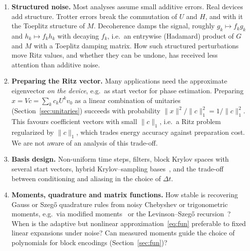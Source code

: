 \documentclass[11pt,a4paper]{article}
\begin{document}
\begin{enumerate}
  vectors $q_k=\pi_k(H)v_0$ can in principle be prepared. One option is to
  apply the Lanczos polynomials through block encodings
  (cf.~\cite{KMM23} and Section~\ref{sec:rr}). Another is an
  operator-level Lanczos recursion, as recently proposed~\cite{OQKD26}.
  Both cost deeper circuits and need recurrence coefficients computed
  from noisy data. This is Lanczos with perturbed coefficients. A theory
  of the resulting loss of orthogonality, in the spirit of Paige's
  analysis of Lanczos in finite precision~\cite{Paige80} with noise
  level $\varepsilon$ in place of $\mathbf u$, would clarify when such schemes beat
  regularized non-orthogonal ones.
\item \textbf{Structured noise.} Most analyses assume small additive
  errors. Real devices add structure. Trotter errors break the
  commutation of $U$ and $H$, and with it the Toeplitz structure of $M$.
  Decoherence damps the signal, roughly $g_k\mapsto f_kg_k$ and
  $h_k\mapsto f_kh_k$ with decaying $f_k$, i.e.\ an entrywise (Hadamard)
  product of $G$ and $M$ with a Toeplitz damping matrix. How such
  structured perturbations move Ritz values, and whether they can be
  undone, has received less attention than additive noise.
\item \textbf{Preparing the Ritz vector.} Many applications need the
  approximate eigenvector \emph{on the device}, e.g.\ as start vector for
  phase estimation. Preparing $x=Vc=\sum_kc_kU^kv_0$ as a linear
  combination of unitaries (Section~\ref{sec:unitaries}) succeeds with
  probability $\|x\|^2/\|c\|_1^2=1/\|c\|_1^2$. This favours coefficient
  vectors with small $\|c\|_1$, i.e.\ a Ritz problem regularized by
  $\|c\|_1$, which trades energy accuracy against preparation cost. We are
  not aware of an analysis of this trade-off.
\item \textbf{Basis design.} Non-uniform time steps, filters, block
  Krylov spaces with several start vectors, hybrid Krylov--sampling
  bases~\cite{SKQD}, and the trade-off between conditioning and aliasing
  in the choice of $\Delta t$.
\item \textbf{Moments, quadrature and matrix functions.} How stable is
  recovering Gauss or Szeg\H{o} quadrature rules from noisy Chebyshev or
  trigonometric moments, e.g.\ via modified moments~\cite{GM10} or the
  Levinson--Szeg\H{o} recursion~\cite{Gragg93}? When is the adaptive but
  nonlinear approximation~\eqref{eq:fun} preferable to fixed linear
  expansions under noise? Can measured moments guide the choice of
  polynomials for block encodings (Section~\ref{sec:fun})?

\end{enumerate}
\end{document}
